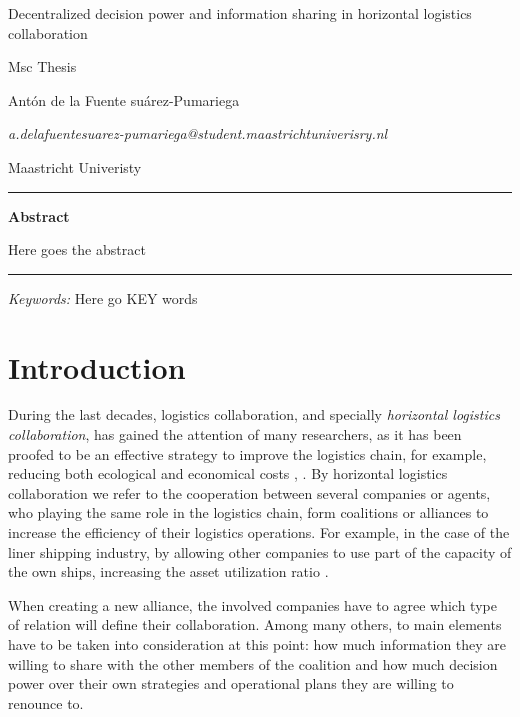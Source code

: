 \documentclass{article}
\begin{document}
\begin{center}

{\Large Decentralized decision power and information sharing in horizontal logistics collaboration} \\\medskip

Msc Thesis
\bigskip

Antón de la Fuente suárez-Pumariega
\medskip

\textit{a.delafuentesuarez-pumariega@student.maastrichtuniverisry.nl}
\bigskip

Maastricht Univeristy
\end{center}
\vspace{1cm}

\hrule
\medskip

\noindent\textbf{Abstract}
\medskip

\noindent Here goes the abstract

\bigskip
\hrule
\bigskip

\textit{Keywords:} Here go KEY words

\section{Introduction}

During the last decades, logistics collaboration, and specially \emph{horizontal
logistics collaboration}, has gained the attention of many researchers, as it
has been proofed to be an effective strategy to improve the logistics chain, for
example, reducing both ecological and economical 
costs \parencite{BALLOT2010}, \parencite{SOYSAL2018168}. By horizontal logistics collaboration we refer to the
cooperation between several companies or agents, who playing the same role in
the logistics chain, form coalitions or alliances to increase the efficiency of
their logistics operations. For example, in the case of the liner shipping
industry, by allowing other companies to use part of the capacity of the own
ships, increasing the asset utilization ratio \parencite{AGARWAL2008175}.

When creating a new alliance, the involved companies have to agree which type of relation will define their collaboration. Among many others, to main elements have to be taken into consideration at this point: how much information they are willing to share with the other members of the coalition and how much decision power over their own strategies and operational plans they are willing to renounce to.
\end{document}
